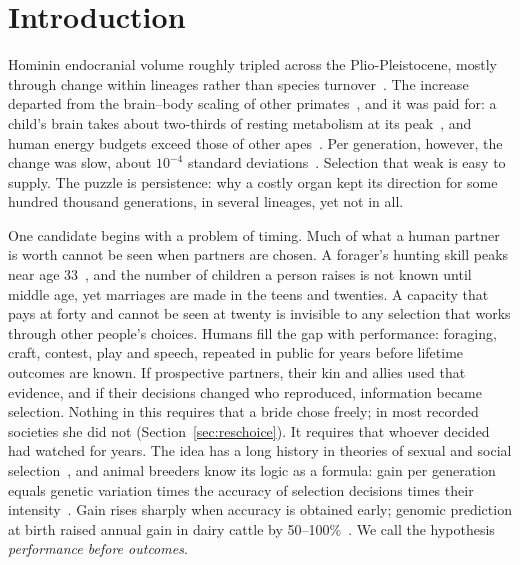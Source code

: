\section{Introduction}\label{sec:intro}

\noindent Hominin endocranial volume roughly tripled across the Plio-Pleistocene, mostly through change within lineages
rather than species turnover~\cite{puschel2024,du2018}. The increase departed from the brain--body scaling of other
primates~\cite{miller2019}, and it was paid for: a child's brain takes about two-thirds of resting metabolism at its
peak~\cite{kuzawa2014}, and human energy budgets exceed those of other apes~\cite{pontzer2016}. Per generation, however, the
change was slow, about $10^{-4}$ standard deviations~\cite{gingerich2022}. Selection that weak is easy to supply. The puzzle
is persistence: why a costly organ kept its direction for some hundred thousand generations, in several lineages, yet not
in all.

One candidate begins with a problem of timing. Much of what a human partner is worth cannot be seen when partners are
chosen. A forager's hunting skill peaks near age 33~\cite{koster2020,gurven2006}, and the number of children a person
raises is not known until middle age, yet marriages are made in the teens and twenties. A capacity that pays at forty and
cannot be seen at twenty is invisible to any selection that works through other people's choices. Humans fill the gap with
performance: foraging, craft, contest, play and speech, repeated in public for years before lifetime outcomes are known.
If prospective partners, their kin and allies used that evidence, and if their decisions changed who reproduced,
information became selection. Nothing in this requires that a bride chose freely; in most recorded societies she did not
(Section~\ref{sec:reschoice}). It requires that whoever decided had watched for years. The idea has a long history in theories of sexual and social
selection~\cite{miller2000ch,miller2000book,hooper2008,westeberhard1983,nesse2007,flinn2005,crespi2022,progovac2026}, and
animal breeders know its logic as a formula: gain per generation equals genetic variation times the accuracy of selection
decisions times their intensity~\cite{lush1937,hazel1943,falconer1996}. Gain rises sharply when accuracy is obtained
early; genomic prediction at birth raised annual gain in dairy cattle by 50--100\%~\cite{garciaruiz2016}. We call the
hypothesis \emph{performance before outcomes}.


